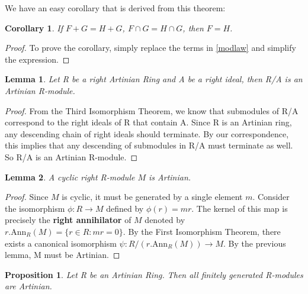 \documentclass[11pt]{article}
\newtheorem{proposition}{Proposition}
\newtheorem{lemma}{Lemma}[section]
\newtheorem{corollary}{Corollary}[section]
\begin{document}
We have an easy corollary that is derived from this theorem:

\noindent
\begin{corollary} If $F+G = H+G$, $F \cap G = H \cap G$, then $F=H$. \end{corollary}

\begin{proof} To prove the corollary, simply replace the terms in \eqref{modlaw} and simplify the expression. \end{proof} 


\begin{lemma} Let R be a right Artinian Ring and A be a right ideal, then R/A is an Artinian R-module.\end{lemma}
 

\begin{proof} From the Third Isomorphism Theorem, we know that submodules of R/A correspond to the right ideals of R that contain A.
Since R is an Artinian ring, any descending chain of right ideals should terminate. By our correspondence, this implies that any descending of submodules in R/A must terminate as well. So R/A is an Artinian R-module.\end{proof}

\noindent
\begin{lemma} \label{lemmacyclic} A cyclic right R-module $M$ is Artinian. \end{lemma}

\noindent
\begin{proof} Since $M$ is cyclic, it must be generated by a single element $m$. Consider the isomorphism $\phi: R \rightarrow M$ defined by $\phi(r) = mr$. The kernel of this map is precisely the \textbf{right annihilator} of $M$ denoted by
$r.\text{Ann}_{R}(M) = \{r \in R : mr = 0\}$. By the First Isomorphism Theorem, there exists a canonical isomorphism  $\psi: R/(r.\text{Ann}_{R}(M)) \rightarrow M$. By the previous lemma, M must be Artinian. \end{proof}

\noindent
\begin{proposition} Let R be an Artinian Ring. Then all finitely generated R-modules are Artinian. \end{proposition}
\end{document}
